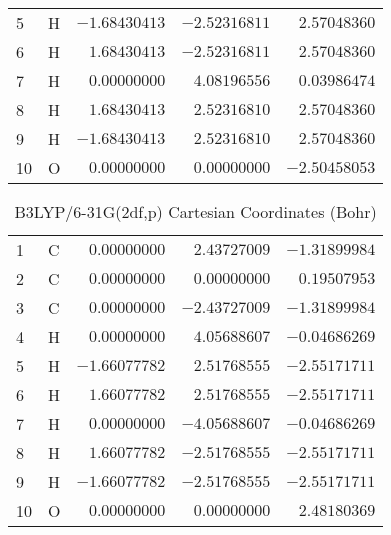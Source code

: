 \documentclass[10pt,oneside]{article}
\begin{document}
\begin{table}[h!]
\begin{multicols}{2}
\begin{tabular}{llrrr}
5  & H  & $-1.68430413$ & $-2.52316811$ & $ 2.57048360$ \\
6  & H  & $ 1.68430413$ & $-2.52316811$ & $ 2.57048360$ \\
7  & H  & $ 0.00000000$ & $ 4.08196556$ & $ 0.03986474$ \\
8  & H  & $ 1.68430413$ & $ 2.52316810$ & $ 2.57048360$ \\
9  & H  & $-1.68430413$ & $ 2.52316810$ & $ 2.57048360$ \\
10 & O  & $ 0.00000000$ & $ 0.00000000$ & $-2.50458053$ \\
\bottomrule
\end{tabular}
\end{multicols}
\end{table}

\begin{table}[h]
\centering
\caption{B3LYP/6-31G(2df,p) Cartesian Coordinates (Bohr)}
\begin{tabular}{llrrr}
\toprule
1  & C  & $ 0.00000000$ & $ 2.43727009$ & $-1.31899984$ \\
2  & C  & $ 0.00000000$ & $ 0.00000000$ & $ 0.19507953$ \\
3  & C  & $ 0.00000000$ & $-2.43727009$ & $-1.31899984$ \\
4  & H  & $ 0.00000000$ & $ 4.05688607$ & $-0.04686269$ \\
5  & H  & $-1.66077782$ & $ 2.51768555$ & $-2.55171711$ \\
6  & H  & $ 1.66077782$ & $ 2.51768555$ & $-2.55171711$ \\
7  & H  & $ 0.00000000$ & $-4.05688607$ & $-0.04686269$ \\
8  & H  & $ 1.66077782$ & $-2.51768555$ & $-2.55171711$ \\
9  & H  & $-1.66077782$ & $-2.51768555$ & $-2.55171711$ \\
10 & O  & $ 0.00000000$ & $ 0.00000000$ & $ 2.48180369$ \\
\bottomrule
\end{tabular}
\end{table}
\end{document}
